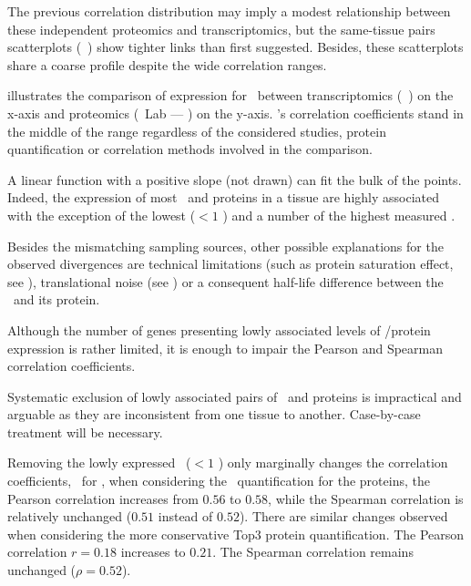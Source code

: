 The previous correlation distribution
may imply a modest relationship between
these independent proteomics and transcriptomics,
but the same-tissue pairs scatterplots (\eg\ )
show tighter links than first suggested.
Besides, these scatterplots share a coarse profile
despite the wide correlation ranges.\mybr\

 illustrates the comparison of expression for \kidney\
between transcriptomics (\uhlen\ \etal) on the x-axis
and proteomics (\pandey\ Lab --- \PPKM) on the y-axis.
\Kidney's correlation coefficients stand in the middle of the range
regardless of the considered studies,
protein quantification or correlation methods involved in the comparison.\mybr\



A linear function with a positive slope (not drawn) can fit the bulk of the points.
Indeed, the expression of most \mRNAs\ and proteins in a tissue
are highly associated
with the exception of the lowest ($<1$ \FPKM) and
a number of the highest measured \mRNAs{}.\mybr\

Besides the mismatching sampling sources,
other possible explanations for the observed divergences are
technical limitations (such as protein saturation effect, see ),
translational noise (see \Cref{subsubsec:exprTrans})
or a consequent half-life difference between the \mRNA\ and its protein.\mybr\

Although the number of genes
presenting lowly associated levels of \mRNA/protein expression is rather limited,
it is enough to impair the Pearson and Spearman correlation coefficients.\mybr\

Systematic exclusion of lowly associated pairs of \mRNAs\ and proteins
is impractical and arguable
as they are inconsistent from one tissue to another.\label{memo:dispersedGenes}
Case-by-case treatment will be necessary.\mybr\

Removing the lowly expressed \mRNAs\ ($<1$ \FPKM) only marginally changes
the correlation coefficients,
\eg\ for \kidney,
when considering the \PPKM\ quantification for the proteins,
the Pearson correlation
increases from $0.56$ to $0.58$,
while the Spearman correlation is relatively unchanged
($0.51$ instead of $0.52$).
There are similar changes observed
when considering the more conservative Top3 protein quantification.
The Pearson correlation $r=0.18$ increases to $0.21$.
The Spearman correlation remains unchanged ($\rho=0.52$).\mybr\

